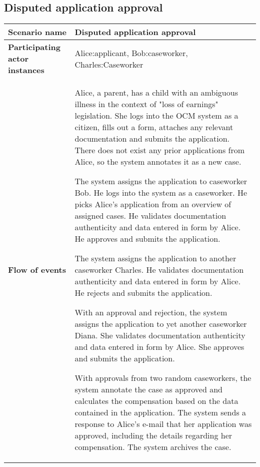 \subsection*{Disputed application approval}
\begin{table}[htb!]
\begin{tabularx}{\textwidth}{l|X}
	\textbf{Scenario name} & Disputed application approval \\
	\hline
	\textbf{Participating actor instances} & Alice:applicant, Bob:caseworker, Charles:Caseworker\\
	\hline
	\textbf{Flow of events} &
	\begin{compactenum}
	        \item Alice, a parent, has a child with an ambiguous illness in the context of "loss of earnings" legislation. She logs into the OCM system as a citizen, fills out a form, attaches any relevant documentation and submits the application. There does not exist any prior applications from Alice, so the system annotates it as a new case.
	        \item The system assigns the application to caseworker Bob. He logs into the system as a caseworker. He picks Alice's application from an overview of assigned cases. He validates documentation authenticity and data entered in form by Alice. He approves and submits the application.
	        \item The system assigns the application to another caseworker Charles. He validates documentation authenticity and data entered in form by Alice. He rejects and submits the application.
	        \item With an approval and rejection, the system assigns the application to yet another caseworker Diana. She validates documentation authenticity and data entered in form by Alice. She approves and submits the application.
	        \item With approvals from two random caseworkers, the system annotate the case as approved and calculates the compensation based on the data contained in the application. The system sends a response to Alice's e-mail that her application was approved, including the details regarding her compensation. The system archives the case.
	   	\end{compactenum}\\
	\hline
\end{tabularx}
\end{table}

\newpage
